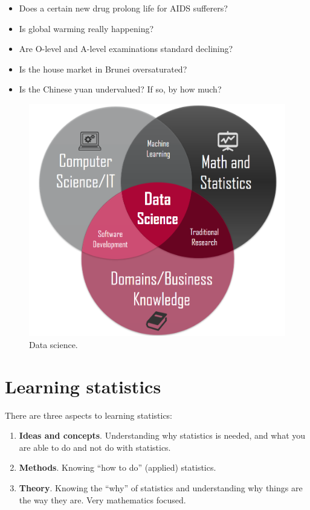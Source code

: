 \documentclass[
]{book}
\providecommand{\tightlist}{%
  \setlength{\itemsep}{0pt}\setlength{\parskip}{0pt}}
\theoremstyle{definition}
\theoremstyle{definition}
\theoremstyle{definition}
\theoremstyle{definition}
\theoremstyle{remark}
\begin{document}
\begin{itemize}
\tightlist
\item
  Does a certain new drug prolong life for AIDS sufferers?
\item
  Is global warming really happening?
\item
  Are O-level and A-level examinations standard declining?
\item
  Is the house market in Brunei oversaturated?
\item
  Is the Chinese yuan undervalued? If so, by how much?
\end{itemize}

\begin{figure}

{\centering \includegraphics[width=0.6\linewidth]{figure/00-ds2} 

}

\caption{Data science.}\label{fig:datascience}
\end{figure}

\hypertarget{learning-statistics}{%
\section*{Learning statistics}\label{learning-statistics}}

There are three aspects to learning statistics:

\begin{enumerate}
\def\labelenumi{\arabic{enumi}.}
\item
  \textbf{Ideas and concepts}. Understanding why statistics is needed, and what you are able to do and not do with statistics.
\item
  \textbf{Methods}. Knowing ``how to do'' (applied) statistics.
\item
  \textbf{Theory}. Knowing the ``why'' of statistics and understanding why things are the way they are. Very mathematics focused.
\end{enumerate}
\end{document}

